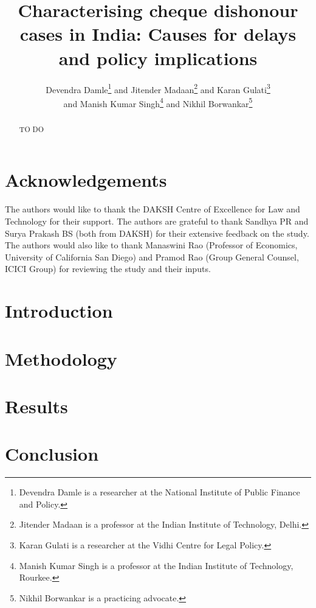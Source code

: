 \documentclass[12pt,a4paper]{article}
\title{Characterising cheque dishonour cases in India: Causes for delays and policy implications}
\author{Devendra Damle\thanks{Devendra Damle is a researcher at the National Institute of Public Finance and Policy.} and Jitender Madaan\thanks{Jitender Madaan is a professor at the Indian Institute of Technology, Delhi.} and Karan Gulati\thanks{Karan Gulati is a researcher at the Vidhi Centre for Legal Policy.}\\ and Manish Kumar Singh\thanks{Manish Kumar Singh is a professor at the Indian Institute of Technology, Rourkee.} and Nikhil Borwankar\thanks{Nikhil Borwankar is a practicing advocate.}}
\begin{document}
\maketitle

\begin{abstract}
TO DO
\end{abstract}

\newpage
\tableofcontents
\newpage
\printglossaries
\listoftables
\newpage

\section*{Acknowledgements}
The authors would like to thank the DAKSH Centre of Excellence for Law and Technology for their support. The authors are grateful to thank Sandhya PR and Surya Prakash BS (both from DAKSH) for their extensive feedback on the study. The authors would also like to thank Manaswini Rao (Professor of Economics, University of California San Diego) and Pramod Rao (Group General Counsel, ICICI Group) for reviewing the study and their inputs.

\newpage
\section{Introduction}
\label{sec:introduction}


\section{Methodology}
\label{sec:methodology}


\section{Results}
\label{sec:results}


\section{Conclusion}
\label{sec:conclusion}


\newpage
\begin{appendices}

\end{appendices}

\newpage
\printbibliography[heading=bibintoc]
\end{document}
